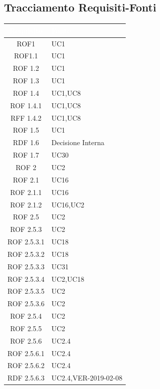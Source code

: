 \subsection{Tracciamento Requisiti-Fonti}\label{TracciamentoRF}
\begin{center}
\begin{longtable}[c]{|c|m{}|}
\hline
\rowcolor{bluelogo}\textbf{\textcolor{white}{Requisito}} & \textbf{\textcolor{white}{Fonte}}\\
\hline \hline
ROF1 & UC1 \\
\hline
\rowcolor{grigio}ROF1.1 & UC1 \\
\hline
ROF 1.2 & UC1 \\
\hline
\rowcolor{grigio}ROF 1.3 & UC1 \\
\hline
ROF 1.4 & UC1,UC8 \\
\hline
\rowcolor{grigio}ROF 1.4.1 & UC1,UC8 \\
\hline
RFF 1.4.2 & UC1,UC8 \\
\hline
\rowcolor{grigio}ROF 1.5 & UC1 \\
\hline
RDF 1.6 & Decisione Interna \\
\hline
\rowcolor{grigio}ROF 1.7 & UC30 \\
\hline
ROF 2 & UC2 \\
\hline
\rowcolor{grigio}ROF 2.1 & UC16 \\
\hline
ROF 2.1.1 & UC16 \\
\hline
\rowcolor{grigio}ROF 2.1.2 & UC16,UC2 \\
\hline
ROF 2.5 & UC2 \\
\hline
\rowcolor{grigio}ROF 2.5.3 & UC2 \\
\hline
ROF 2.5.3.1 & UC18 \\
\hline
\rowcolor{grigio}ROF 2.5.3.2 & UC18 \\
\hline
ROF 2.5.3.3 & UC31 \\
\hline
\rowcolor{grigio}ROF 2.5.3.4 & UC2,UC18 \\
\hline
ROF 2.5.3.5 & UC2 \\
\hline
\rowcolor{grigio}ROF 2.5.3.6 & UC2 \\
\hline
ROF 2.5.4 & UC2 \\
\hline
\rowcolor{grigio}ROF 2.5.5 & UC2 \\
\hline
ROF 2.5.6 & UC2.4 \\
\hline
\rowcolor{grigio}ROF 2.5.6.1 & UC2.4 \\
\hline
ROF 2.5.6.2 & UC2.4 \\
\hline
\rowcolor{grigio}RDF 2.5.6.3 & UC2.4,VER-2019-02-08 \\

\end{longtable}
\end{center}
